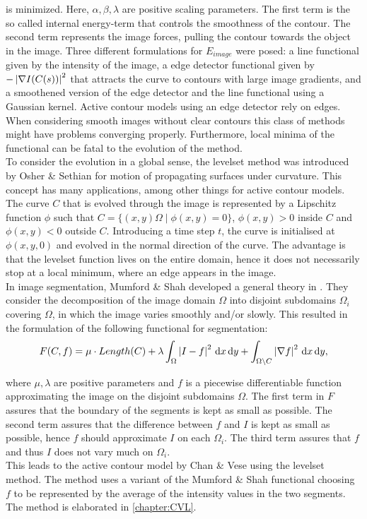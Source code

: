 is minimized. Here, $\alpha, \beta, \lambda$ are positive scaling parameters. The first term is the so called internal energy-term that controls the smoothness of the contour. The second term represents the image forces, pulling the contour towards the object in the image. Three different formulations for $E_{image}$ were posed: a line functional given by the intensity of the image, a edge detector functional given by $-\left| {\nabla I(C(s))} \right|^2$ that attracts the curve to contours with large image gradients, and a smoothened version of the edge detector and the line functional using a Gaussian kernel. Active contour models using an edge detector rely on edges. When considering smooth images without clear contours this class of methods might have problems converging properly. Furthermore, local minima of the functional can be fatal to the evolution of the method.\\

To consider the evolution in a global sense, the levelset method was introduced by Osher \& Sethian \cite{osher.88} for motion of propagating surfaces under curvature. This concept has many applications, among other things for active contour models. The curve $C$ that is evolved through the image is represented by a Lipschitz function $\phi$ such that $C=\{(x,y)\Omega\;|\; \phi(x,y) = 0\}$, $\phi(x,y)> 0$ inside $C$ and $\phi(x,y)<0$ outside $C$. Introducing a time step $t$, the curve is initialised at $\phi(x,y,0)$ and evolved in the normal direction of the curve. The advantage is that the levelset function lives on the entire domain, hence it does not necessarily stop at a local minimum, where an edge appears in the image.\\

In image segmentation, Mumford \& Shah developed a general theory in \cite{mumford.89}. They consider the decomposition of the image domain $\Omega$ into disjoint subdomains $\Omega_i$ covering $\Omega$, in which the image varies smoothly and/or slowly. This resulted in the formulation of the following functional for segmentation:
\begin{equation}
  F(C,f) = \mu\cdot Length(C) + \lambda \int_\Omega \left| {I-f} \right|^2 \,{\rm d} x\,{\rm d} y + \int_{\Omega\backslash C} \left| {\nabla f} \right|^2 \,{\rm d} x\,{\rm d} y,
\end{equation}

where $\mu,\lambda$ are positive parameters and $f$ is a piecewise differentiable function approximating the image on the disjoint subdomains $\Omega$. The first term in $F$ assures that the boundary of the segments is kept as small as possible. The second term assures that the difference between $f$ and $I$ is kept as small as possible, hence $f$ should approximate $I$ on each $\Omega_i$. The third term assures that $f$ and thus $I$ does not vary much on $\Omega_i$.\\
This leads to the active contour model by Chan \& Vese \cite{chan.01} using the levelset method. The method uses a variant of the Mumford \& Shah functional choosing $f$ to be represented by the average of the intensity values in the two segments. The method is elaborated in \cref{chapter:CVL}.\\

